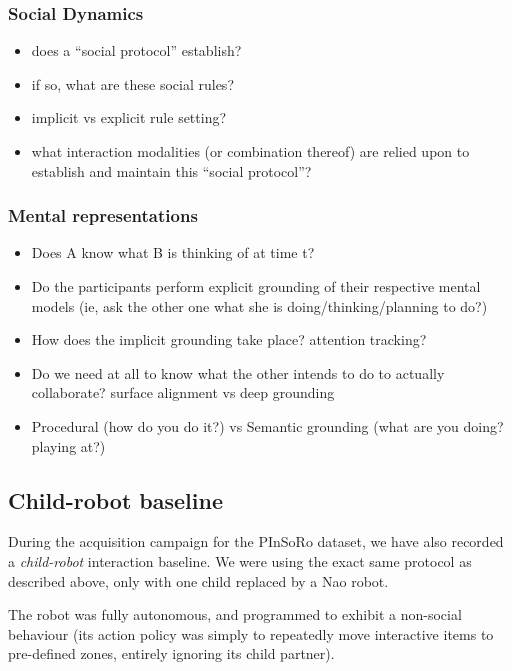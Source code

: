 \documentclass{article}
\begin{document}
\subsubsection{Social Dynamics}

\begin{itemize}
    \item does a ``social protocol'' establish?
    \item if so, what are these social rules?
    \item implicit vs explicit rule setting?
    \item what interaction modalities (or combination thereof) are relied upon
        to establish and maintain this ``social protocol''?
\end{itemize}

\subsubsection{Mental representations}

\begin{itemize}
    \item Does A know what B is thinking of at time t?
    \item Do the participants perform explicit grounding of their respective mental models
        (ie, ask the other one what she is doing/thinking/planning to do?)
    \item How does the implicit grounding take place? attention tracking?
    \item Do we need at all to know what the other intends to do to actually
        collaborate? surface alignment vs deep grounding
    \item Procedural (how do you do it?) vs Semantic
        grounding (what are you doing? playing at?)
\end{itemize}

\subsection{Child-robot baseline}

During the acquisition campaign for the PInSoRo dataset, we have also recorded a
\emph{child-robot} interaction baseline. We were using the exact same protocol
as described above, only with one child replaced by a Nao robot.

The robot was fully autonomous, and programmed to exhibit a non-social behaviour
(its action policy was simply to repeatedly move interactive items to
pre-defined zones, entirely ignoring its child partner).
\end{document}
